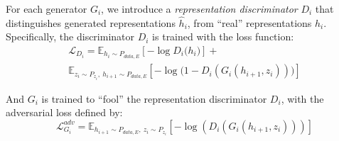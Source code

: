 \documentclass[10pt,twocolumn,letterpaper]{article}
\begin{document}
For each generator $G_{i}$, we introduce a \emph{representation discriminator} $D_{i}$ that distinguishes generated representations $\hat{h}_{i}$, from ``real'' representations ${h_{i}}$. Specifically, the discriminator $D_{i}$ is trained with the loss function:
\begin{multline}
\mathcal{L}_{D_{i}} = \mathbb{E}_{h_{i}\sim P_{data, E}}[-\log D_{i}\big(h_{i})]  + \\
 \mathbb{E}_{z_{i}\sim P_{z_{i}},{\ } h _{i+1}\sim P_{data, E}}[-\log \big(1-D_{i}(G_{i}(h_{i+1},z_{i}))\big)]
\end{multline}


And $G_{i}$ is trained to ``fool'' the representation discriminator $D_{i}$, with the adversarial loss defined by:
\begin{equation}\mathcal{L}_{G_{i}}^{adv} =\mathbb{E}_{h_{i+1}\sim P_{data, E},{\ } z_{i}\sim P_{z_{i}}}[-\log (D_{i}(G_{i}(h_{i+1}, z_{i})))]\end{equation}




\end{document}
